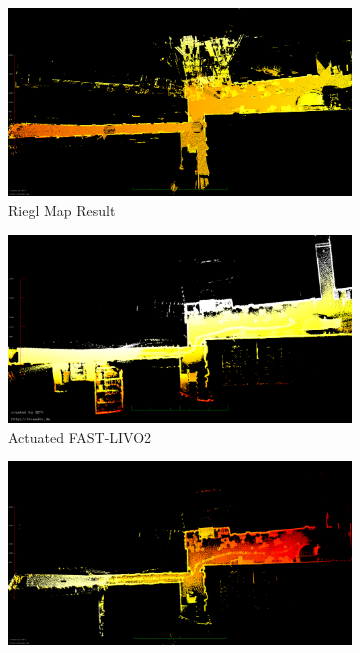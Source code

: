 \documentclass[english, bachelor, utf8]{base/thesis_telematics}
\begin{document}
\begin{figure}[t]
\centering
\begin{subfigure}{0.492\columnwidth}
        \centering
        \includegraphics[width=\textwidth]{pics/eagle_view/riegl_top.png}
        \caption{Riegl Map Result}
        \label{fig:riegl_top}\end{subfigure}
\hfill
\begin{subfigure}{0.492\columnwidth}
        \centering
        \includegraphics[width=\textwidth]{pics/eagle_view/act_livo_to.png}
        \caption{Actuated FAST-LIVO2}
        \label{fig:act_livo_top}
\end{subfigure}\vspace{2mm}
\begin{subfigure}{0.492\columnwidth}
        \centering
        \includegraphics[width=\textwidth]{pics/eagle_view/act_lio_top.png}

\end{subfigure}
\end{figure}
\end{document}
